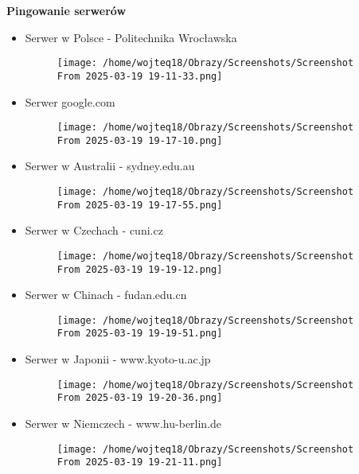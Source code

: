 \documentclass[12pt]{article}
\begin{document}
\textbf{Pingowanie serwerów}
\begin{itemize}
  \item Serwer w Polsce - Politechnika Wrocławska
    \begin{figure}[H]
      \centering
      \texttt{[image: /home/wojteq18/Obrazy/Screenshots/Screenshot From 2025-03-19 19-11-33.png]}
      \label{fig:ping_politechnika}
    \end{figure}
    \vspace{1\baselineskip}

  \item Serwer google.com
    \begin{figure}[H]
      \centering
      \texttt{[image: /home/wojteq18/Obrazy/Screenshots/Screenshot From 2025-03-19 19-17-10.png]}
      \label{fig:ping_google}
    \end{figure}

  \item Serwer w Australii - sydney.edu.au
    \begin{figure}[H]
      \centering
      \texttt{[image: /home/wojteq18/Obrazy/Screenshots/Screenshot From 2025-03-19 19-17-55.png]}
      \label{fig:ping_sydney}
    \end{figure}

  \item Serwer w Czechach - cuni.cz
    \begin{figure}[H]
      \centering
      \texttt{[image: /home/wojteq18/Obrazy/Screenshots/Screenshot From 2025-03-19 19-19-12.png]}
      \label{fig:ping_cuni}
    \end{figure}
    \vspace{3\baselineskip}

  \item Serwer w Chinach - fudan.edu.cn
    \begin{figure}[H]
      \centering
      \texttt{[image: /home/wojteq18/Obrazy/Screenshots/Screenshot From 2025-03-19 19-19-51.png]}
      \label{fig:ping_fudan}
    \end{figure}

  \item Serwer w Japonii - www.kyoto-u.ac.jp
    \begin{figure}[H]
      \centering
      \texttt{[image: /home/wojteq18/Obrazy/Screenshots/Screenshot From 2025-03-19 19-20-36.png]}
      \label{fig:ping_kyoto}
    \end{figure}

  \item Serwer w Niemczech - www.hu-berlin.de
    \begin{figure}[H]
      \centering
      \texttt{[image: /home/wojteq18/Obrazy/Screenshots/Screenshot From 2025-03-19 19-21-11.png]}
      \label{fig:ping_hu_berlin}
    \end{figure}
\end{itemize}
\end{document}
